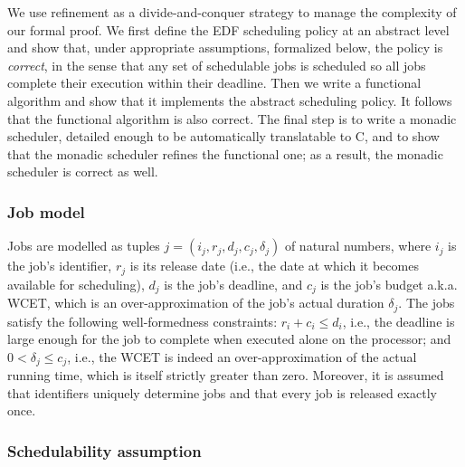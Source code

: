 	We use refinement %
	as a divide-and-conquer strategy to manage the complexity of our formal proof.
	We first define the EDF scheduling policy at an abstract level and show that,
	under appropriate assumptions, formalized below, the policy is \emph{correct},
	in the sense that any set of schedulable jobs is scheduled so all jobs complete
	their execution within their deadline. Then we write a functional algorithm and
	show that it implements the abstract scheduling policy. It follows that the functional
	algorithm is also correct. The final step is to write a monadic scheduler,
	detailed enough to be automatically translatable to C, and to show that
	the monadic scheduler refines the functional one; as a result, the monadic scheduler is correct as well.

	\subsubsection{Job model}
	\label{sec:jobmodel}
	Jobs are modelled as tuples $j = (i_j, r_j,d_j,c_j, \delta_j)$  of natural numbers, where $i_j$ is the job's identifier, $r_j$ is its release date (i.e., the date at which it becomes available for scheduling), $d_j$ is the job's deadline, and $c_j$ is the job's budget a.k.a. WCET, which is an over-approximation of the job's actual duration $\delta_j$. The jobs satisfy the following well-formedness constraints:
	$r_i + c_i \leq d_i$, i.e., the deadline is large enough for the job to complete when executed alone on the processor; and $0 < \delta_j \leq c_j$, i.e., the WCET is indeed an over-approximation of the actual running time, which is itself strictly greater than zero. Moreover, it is assumed that identifiers uniquely determine jobs and that every job is released exactly once.


	\subsubsection{Schedulability assumption}

